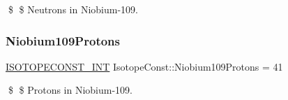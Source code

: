 \$ \$ Neutrons in Niobium-\/109. \mbox{\label{group___isotope_const-_niobium-_nb109_gacfc47091adb8c46056566b0ce2efc900}} 
\subsubsection{\texorpdfstring{Niobium109\+Protons}{Niobium109Protons}}
{\footnotesize\ttfamily \mbox{\hyperlink{group___isotope_const-_macros_ga5f18360b3e99483a35c32d789e62621c}{I\+S\+O\+T\+O\+P\+E\+C\+O\+N\+S\+T\+\_\+\+I\+NT}} Isotope\+Const\+::\+Niobium109\+Protons = 41}

\$ \$ Protons in Niobium-\/109. 